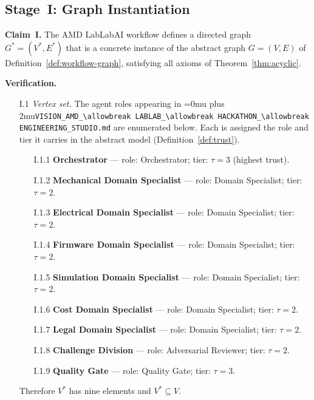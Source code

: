 \documentclass[12pt]{article}
\theoremstyle{definition}
\DeclareRobustCommand{\code}[1]{\begingroup\Urlmuskip=0mu plus 2mu\relax\nolinkurl{#1}\endgroup}
\newcommand{\VisionHackathon}{\code{VISION\_AMD\_\allowbreak LABLAB\_\allowbreak HACKATHON\_\allowbreak ENGINEERING\_STUDIO.md}}
\begin{document}
\subsection{Stage~I: Graph Instantiation}
\label{sec:case-study-graph}

\noindent\textbf{Claim~I.} The AMD LabLabAI workflow defines a directed
graph $G^{*} = (V^{*}, E^{*})$ that is a concrete instance of the abstract
graph $G = (V, E)$ of Definition~\ref{def:workflow-graph}, satisfying all axioms
of Theorem~\ref{thm:acyclic}.

\medskip
\noindent\textbf{Verification.}
\begin{enumerate}
    \item[I.1] \emph{Vertex set.}  The agent roles appearing in
               \VisionHackathon{} are enumerated below.  Each is
               assigned the role and tier it carries in the abstract model
               (Definition~\ref{def:trust}).
               \begin{enumerate}
                   \item[I.1.1] \textbf{Orchestrator} --- role: Orchestrator;
                                tier: $\tau = 3$ (highest trust).
                   \item[I.1.2] \textbf{Mechanical Domain Specialist} ---
                                role: Domain Specialist; tier: $\tau = 2$.
                   \item[I.1.3] \textbf{Electrical Domain Specialist} ---
                                role: Domain Specialist; tier: $\tau = 2$.
                   \item[I.1.4] \textbf{Firmware Domain Specialist} ---
                                role: Domain Specialist; tier: $\tau = 2$.
                   \item[I.1.5] \textbf{Simulation Domain Specialist} ---
                                role: Domain Specialist; tier: $\tau = 2$.
                   \item[I.1.6] \textbf{Cost Domain Specialist} ---
                                role: Domain Specialist; tier: $\tau = 2$.
                   \item[I.1.7] \textbf{Legal Domain Specialist} ---
                                role: Domain Specialist; tier: $\tau = 2$.
                   \item[I.1.8] \textbf{Challenge Division} ---
                                role: Adversarial Reviewer; tier: $\tau = 2$.
                   \item[I.1.9] \textbf{Quality Gate} ---
                                role: Quality Gate; tier: $\tau = 3$.
               \end{enumerate}
               Therefore $V^{*}$ has nine elements and $V^{*} \subseteq V$. \checkmark


\end{enumerate}
\end{document}

